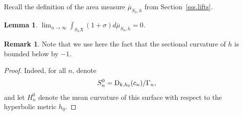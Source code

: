 \documentclass[JEP,XML,SOM,Unicode,NoEqCountersInSection,published]{cedram}
\theoremstyle{plain}
\newtheorem{lemma}[theorem]{Lemma}
\theoremstyle{definition}
\newtheorem{remark}[theorem]{Remark}
\begin{document}
Recall the definition of the area measure $\overline{\mu}_{S_n,h}$ from Section~\ref{sss.lifts}.

\begin{lemma}\label{l.sect_approaches-1}
$\displaystyle\lim_{n\to\infty} \int_{S_hX}(1+\sigma)d\overline{\mu}_{S_n,h}=0$.
\end{lemma}

\begin{remark}
Note that we use here the fact that the sectional curvature of $h$ is bounded below by $-1$.
\end{remark}

\begin{proof}
Indeed, for all $n$, denote\vspace*{-3pt}
\begin{equation*}
S_n^0=\text D_{k,h_0}(c_n)/\Gamma_n,
\end{equation*}
and let $H_n^0$ denote the mean curvature of this surface with respect to the hyperbolic metric $h_0$.


\end{proof}
\end{document}
